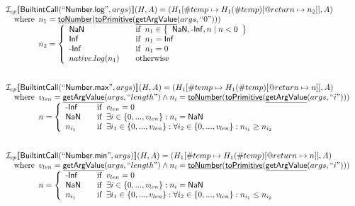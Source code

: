 \documentclass{article}
\newcommand{\SF}[1]{\mbox{\textsf{#1}}}
\newcommand{\wherec}[1]{{\rm where}\begin{array}[t]{l}#1\end{array}}
\newcommand{\ifc}[1]{{\rm if}\begin{array}[t]{l}#1\end{array}}
\newcommand{\owc}{{\rm otherwise}}
\newcommand{\I}{\mathcal{I}}
\newcommand{\set}[1]{\left\{\begin{array}{l}#1\end{array}\right\}}
\newcommand{\lbr}{\llbracket}
\newcommand{\rbr}{\rrbracket}
\newcommand{\hf}[1]{\underline{\sf #1}}
\begin{document}
\[\begin{array}{l}
\I _{cp}\lbr \SF{BuiltintCall}(``\SF{Number.log}",args)\rbr(H,A)
  = (H_1[\#temp \mapsto H_1(\#temp)[@return \mapsto n_2]], A)\\
\quad\wherec{
  n_1 = \hf{toNumber}(\hf{toPrimitive}(\hf{getArgValue}(args, ``0")))\\
  n_2 = \left\{
    \begin{array}{l@{\quad\quad}l}
      \SF{NaN} & \ifc{n_1 \in \set{\SF{NaN}, \SF{-Inf}, n \mid n<0}}\\
      \SF{Inf} & \ifc{n_1=\SF{Inf}}\\
      \SF{-Inf} & \ifc{n_1=0}\\
      native.log(n_1) & \owc 
    \end{array}
  \right.
  }\\
\\\\


\I _{cp}\lbr \SF{BuiltintCall}(``\SF{Number.max}",args)\rbr(H,A)
  = (H_1[\#temp \mapsto H_1(\#temp)[@return \mapsto n]], A)\\
\quad\wherec{
  v_{len} = \hf{getArgValue}(args, ``length")
  \land n_i = \hf{toNumber}(\hf{toPrimitive}(\hf{getArgValue}(args, ``i")))\\
  n =
    \left\{\begin{array}{l@{\quad\quad}l}
	  \SF{-Inf} & \ifc{v_{len} = 0}\\
	  \SF{NaN} & \ifc{\exists i \in \{0,..., v_{len}\}: n_i = \SF{NaN}}\\
      n_{i_1} & \ifc{\exists i_1 \in \{0,..., v_{len}\}: \forall i_2 \in \{0,..., v_{len}\}: n_{i_1} \geq n_{i_2}}
    \end{array}\right.
  }\\
\\\\



\I _{cp}\lbr \SF{BuiltintCall}(``\SF{Number.min}",args)\rbr(H,A)
  = (H_1[\#temp \mapsto H_1(\#temp)[@return \mapsto n]], A)\\
\quad\wherec{
  v_{len} = \hf{getArgValue}(args, ``length")
  \land n_i = \hf{toNumber}(\hf{toPrimitive}(\hf{getArgValue}(args, ``i")))\\
  n =
    \left\{\begin{array}{l@{\quad\quad}l}
	  \SF{-Inf} & \ifc{v_{len} = 0}\\
	  \SF{NaN} & \ifc{\exists i \in \{0,..., v_{len}\}: n_i = \SF{NaN}}\\
      n_{i_1} & \ifc{\exists i_1 \in \{0,..., v_{len}\}: \forall i_2 \in \{0,..., v_{len}\}: n_{i_1} \leq n_{i_2}}
    \end{array}\right.
  }\\
\\\\


\end{array}
\]
\end{document}
